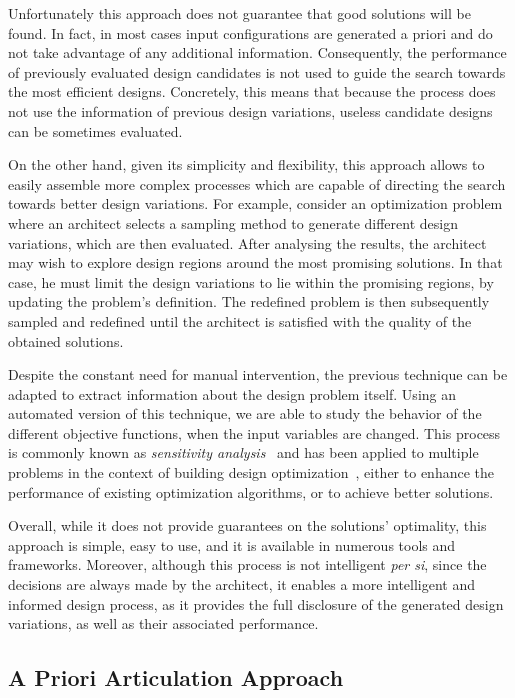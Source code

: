 	Unfortunately this approach does not guarantee that good solutions will be found. In fact, in most cases input configurations are generated a priori and do not take advantage of any additional information. Consequently, the performance of previously evaluated design candidates is not used to guide the search towards the most efficient designs. Concretely, this means that because the process does not use the information of previous design variations, useless candidate designs can be sometimes evaluated.
	
	On the other hand, given its simplicity and flexibility, this approach allows to easily assemble more complex processes which are capable of directing the search towards better design variations. For example, consider an optimization problem where an architect selects a sampling method to generate different design variations, which are then evaluated. After analysing the results, the architect may wish to explore design regions around the most promising solutions. In that case, he must limit the design variations to lie within the promising regions, by updating the problem’s definition. The redefined problem is then subsequently sampled and redefined until the architect is satisfied with the quality of the obtained solutions.
	
	Despite the constant need for manual intervention, the previous technique can be adapted to extract information about the design problem itself. Using an automated version of this technique, we are able to study the behavior of the different objective functions, when the input variables are changed. This process is commonly known as \textit{sensitivity analysis}~\cite{Saltelli2007} and has been applied to multiple problems in the context of building design optimization~\cite{Tian2013}, either to enhance the performance of existing optimization algorithms, or to achieve better solutions.

	Overall, while it does not provide guarantees on the solutions’ optimality, this approach is simple, easy to use, and it is available in numerous tools and frameworks. Moreover, although this process is not intelligent \textit{per si}, since the decisions are always made by the architect, it enables a more intelligent and informed design process, as it provides the full disclosure of the generated design variations, as well as their associated performance.
	
\subsection{A Priori Articulation Approach}
\label{subsec:preferencesarticulation}

